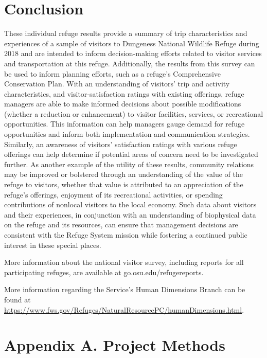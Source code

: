 \documentclass[]{book}
\begin{document}
\chapter{Conclusion}\label{concl}

These individual refuge results provide a summary of trip
characteristics and experiences of a sample of visitors to Dungeness
National Wildlife Refuge during 2018 and are intended to inform
decision-making efforts related to visitor services and transportation
at this refuge. Additionally, the results from this survey can be used
to inform planning efforts, such as a refuge's Comprehensive
Conservation Plan. With an understanding of visitors' trip and activity
characteristics, and visitor-satisfaction ratings with existing
offerings, refuge managers are able to make informed decisions about
possible modifications (whether a reduction or enhancement) to visitor
facilities, services, or recreational opportunities. This information
can help managers gauge demand for refuge opportunities and inform both
implementation and communication strategies. Similarly, an awareness of
visitors' satisfaction ratings with various refuge offerings can help
determine if potential areas of concern need to be investigated further.
As another example of the utility of these results, community relations
may be improved or bolstered through an understanding of the value of
the refuge to visitors, whether that value is attributed to an
appreciation of the refuge's offerings, enjoyment of its recreational
activities, or spending contributions of nonlocal visitors to the local
economy. Such data about visitors and their experiences, in conjunction
with an understanding of biophysical data on the refuge and its
resources, can ensure that management decisions are consistent with the
Refuge System mission while fostering a continued public interest in
these special places.

More information about the national visitor survey, including reports
for all participating refuges, are available at
go.osu.edu/refugereports.

More information regarding the Service's Human Dimensions Branch can be
found at
\url{https://www.fws.gov/Refuges/NaturalResourcePC/humanDimensions.html}.

\appendix


\chapter*{Appendix A. Project
Methods}\label{appendix-a.-project-methods}
\end{document}
